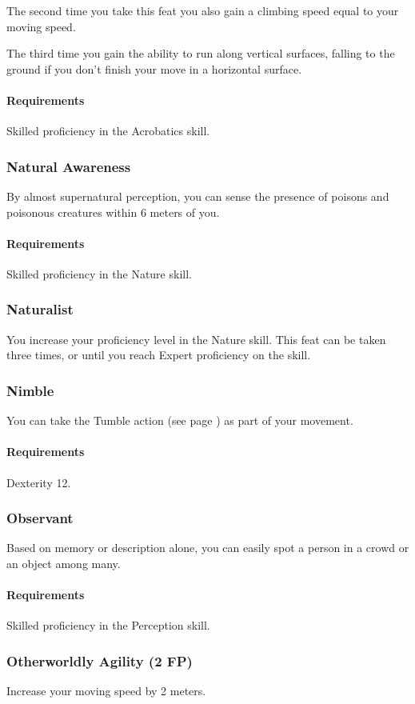     The second time you take this feat you also gain a climbing speed equal to your moving speed.

    The third time you gain the ability to run along vertical surfaces, falling to the ground if you don't finish your move in a horizontal surface.
    \paragraph{Requirements} Skilled proficiency in the Acrobatics skill.
\subsubsection{Natural Awareness} \label{feat::naturalawareness}
    By almost supernatural perception, you can sense the presence of poisons and poisonous creatures within 6 meters of you.

    \paragraph{Requirements} Skilled proficiency in the Nature skill.
\subsubsection{Naturalist} \label{feat::naturalist}
    You increase your proficiency level in the Nature skill.
    This feat can be taken three times, or until you reach Expert proficiency on the skill.
\subsubsection{Nimble} \label{feat::nimble}
    You can take the Tumble action (see page \pageref{act::tumble}) as part of your movement.
    \paragraph{Requirements} Dexterity 12.
\subsubsection{Observant} \label{feat::observant}
    Based on memory or description alone, you can easily spot a person in a crowd or an object among many.
    \paragraph{Requirements} Skilled proficiency in the Perception skill.
\subsubsection{Otherworldly Agility (2 FP)} \label{feat::otherwordlyagility}
    Increase your moving speed by 2 meters.

